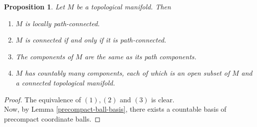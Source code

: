 \documentclass[reqno]{amsart}
\theoremstyle{plain}%
\newtheorem{proposition}[theorem]{Proposition}
\theoremstyle{definition}
\theoremstyle{remark}
\begin{document}
    \begin{proposition}\label{manifold-countable-components}
        Let $M$ be a topological manifold. Then
        \begin{enumerate}
            \item $M$ is locally path-connected.
                 \item $M$ is connected if and only if it is path-connected.
                 \item The components of $M$ are the same as its path components.
                 \item $M$ has countably many components, each of which is an open
                     subset of $M$ and a connected topological manifold.
        \end{enumerate}
    \end{proposition}
    \begin{proof}
        The equivalence of $(1),(2)$ and $(3)$ is clear.\\
        Now, by Lemma \ref{precompact-ball-basis}, there exists a countable basis
        of precompact coordinate balls. 
    \end{proof}
\end{document}

